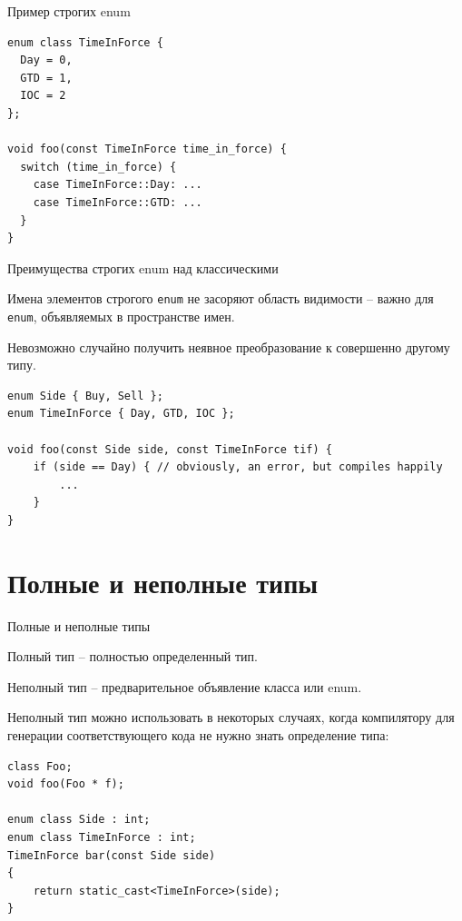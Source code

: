 \documentclass[unknownkeysallowed,xcolor=table]{beamer}
\begin{document}
\begin{frame}[fragile]{Пример строгих enum}

\begin{lstlisting}
enum class TimeInForce {
  Day = 0,
  GTD = 1,
  IOC = 2
};

void foo(const TimeInForce time_in_force) {
  switch (time_in_force) {
    case TimeInForce::Day: ...
    case TimeInForce::GTD: ...
  }
}
\end{lstlisting}

\end{frame}

\begin{frame}[fragile]{Преимущества строгих enum над классическими}

Имена элементов строгого \lstinline{enum} не засоряют область видимости -- важно для \lstinline{enum}, объявляемых в пространстве имен.

\vspace{2em}

Невозможно случайно получить неявное преобразование к совершенно другому типу.

\vspace{1em}

\begin{lstlisting}
enum Side { Buy, Sell };
enum TimeInForce { Day, GTD, IOC };

void foo(const Side side, const TimeInForce tif) {
    if (side == Day) { // obviously, an error, but compiles happily
        ...
    }
}
\end{lstlisting}

\end{frame}


\section{Полные и неполные типы}

\begin{frame}[fragile]{Полные и неполные типы}

Полный тип -- полностью определенный тип.

\vspace{0.7em}

Неполный тип -- предварительное объявление класса или enum.

\vspace{1.2em}

Неполный тип можно использовать в некоторых случаях, когда компилятору для генерации соответствующего кода не нужно знать определение типа:

\vspace{0.5em}

\begin{lstlisting}
class Foo;
void foo(Foo * f);

enum class Side : int;
enum class TimeInForce : int;
TimeInForce bar(const Side side)
{
    return static_cast<TimeInForce>(side);
}
\end{lstlisting}

\end{frame}
\end{document}
